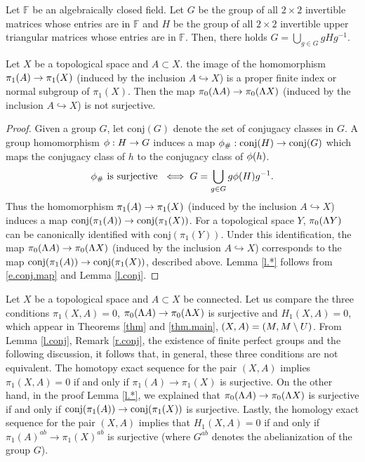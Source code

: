 \documentclass[11pt,twoside]{article}
\begin{document}
\begin{rmk}\label{r.conj}
Let \(\mathbb{F}\) be an algebraically closed field. Let \(G\) be the group of all \(2\times 2\) invertible matrices whose entries are in \(\mathbb{F}\) and \(H\) be the group of all \(2\times 2\) invertible upper triangular matrices whose entries are in \(\mathbb{F}\). Then, there holds \(G= \bigcup\limits_{g\in G}gHg^{-1}.\)
\end{rmk}

\begin{lem}\label{l.*}
Let \(X\) be a topological space and \(A\subset X\). \sps the image of the homomorphism \(\pi_1(A)\rightarrow \pi_1(X)\) (induced by the inclusion $A\hookrightarrow X$) is a proper finite index or normal subgroup of \(\pi_1(X)\). Then the map \(\pi_0(\Lambda A)\rightarrow \pi_0(\Lambda X)\) (induced by the inclusion $A\hookrightarrow X$) is not surjective.
\end{lem}
\begin{proof}
Given a group \(G\), let \(\text{conj}(G)\) denote the set of conjugacy classes in \(G\). A group homomorphism \(\phi:H\rightarrow G\) induces a map \(\phi_{\#}:\text{conj}(H)\rightarrow \text{conj}(G)\) which maps the conjugacy class of \(h\) to the conjugacy class of \(\phi(h)\).  
\begin{equation}\label{e.conj.map}
\phi_{\#} \text{ is surjective }\iff G=\bigcup_{g\in G}g\phi(H)g^{-1}.
\end{equation}
Thus the homomorphism \(\pi_1(A)\rightarrow \pi_1(X)\) (induced by the inclusion $A\hookrightarrow X$) induces a map \(\text{conj}(\pi_1(A))\rightarrow \text{conj}(\pi_1(X))\). For a topological space $Y$, \(\pi_0(\Lambda Y)\) can be canonically identified with \(\text{conj}(\pi_1(Y))\). Under this identification, the map \(\pi_0(\Lambda A)\rightarrow \pi_0(\Lambda X)\) (induced by the inclusion $A\hookrightarrow X$) corresponds to the map \(\text{conj}(\pi_1(A))\rightarrow \text{conj}(\pi_1(X))\), described above. \tf Lemma \ref{l.*} follows from \eqref{e.conj.map} and Lemma \ref{l.conj}. 
\end{proof}

\begin{rmk}\label{r.comp}
Let \(X\) be a topological space and \(A\subset X\) be connected. Let us compare the three conditions $\pi_1(X,A)=0$, \(\pi_0(\Lambda A)\rightarrow \pi_0(\Lambda X)\) is surjective and \(H_1(X,A)=0\), which appear in Theorems \ref{thm} and \ref{thm.main}, \w $(X,A)=(M,M \setminus U)$. From Lemma \ref{l.conj}, Remark \ref{r.conj}, the existence of finite perfect groups and the following discussion, it follows that, in general, these three conditions are not equivalent. The homotopy exact sequence for the pair $(X,A)$ implies \(\pi_1(X,A)=0\) if and only if $\pi_1(A)\rightarrow \pi_1(X)$ is surjective. On the other hand, in the proof Lemma \ref{l.*}, we explained that \(\pi_0(\Lambda A)\rightarrow \pi_0(\Lambda X)\) is surjective if and only if \(\text{conj}(\pi_1(A))\rightarrow \text{conj}(\pi_1(X))\) is surjective. Lastly, the homology exact sequence for the pair $(X,A)$ implies that \(H_1(X,A)=0\) if and only if $\pi_1(A)^{ab}\rightarrow \pi_1(X)^{ab}$ is surjective (where $G^{ab}$ denotes the abelianization of the group $G$).
\end{rmk}
\end{document}
